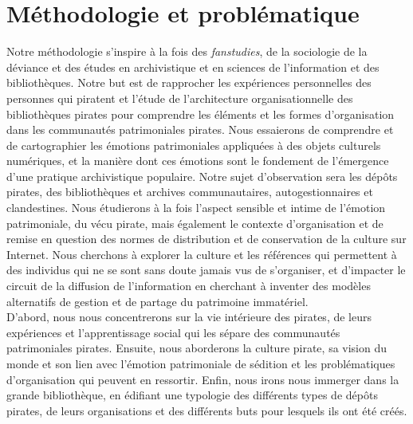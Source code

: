 \section{Méthodologie et problématique}


Notre méthodologie s'inspire à la fois des \textit{fanstudies}, de la sociologie de la déviance et des études en archivistique et en sciences de l'information et des bibliothèques. Notre but est de rapprocher les expériences personnelles des personnes qui piratent et l'étude de l'architecture organisationnelle des bibliothèques pirates pour comprendre les éléments et les formes d'organisation dans les communautés patrimoniales pirates. Nous essaierons de comprendre et de cartographier les émotions patrimoniales appliquées à des objets culturels numériques, et la manière dont ces émotions sont le fondement de l'émergence d'une pratique archivistique populaire. Notre sujet d'observation sera les dépôts pirates, des bibliothèques et archives communautaires, autogestionnaires et clandestines. Nous étudierons à la fois l'aspect sensible et intime de l'émotion patrimoniale, du vécu pirate, mais également le contexte d'organisation et de remise en question des normes de distribution et de conservation de la culture sur Internet. Nous cherchons à explorer la culture et les références qui permettent à des individus qui ne se sont sans doute jamais vus de s'organiser, et d'impacter le circuit de la diffusion de l'information en cherchant à inventer des modèles alternatifs de gestion et de partage du patrimoine immatériel. \\


D'abord, nous nous concentrerons sur la vie intérieure des pirates, de leurs expériences et l'apprentissage social qui les sépare des communautés patrimoniales pirates. Ensuite, nous aborderons la culture pirate, sa vision du monde et son lien avec l'émotion patrimoniale de sédition et les problématiques d'organisation qui peuvent en ressortir. Enfin, nous irons nous immerger dans la grande bibliothèque, en édifiant une typologie des différents types de dépôts pirates, de leurs organisations et des différents buts pour lesquels ils ont été créés.


